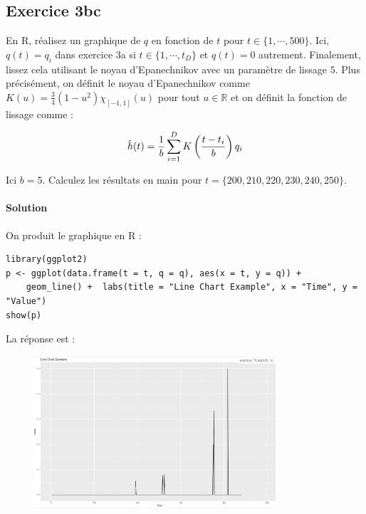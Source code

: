 \documentclass[../main.tex]{subfiles}
\begin{document}
\begin{CJK*}{UTF8}{gbsn}
\section*{Exercice 3bc}
En R, réalisez un graphique de $q$ en fonction de $t$ pour $t \in \{1, \cdots, 500\}$.
Ici, $q(t) = q_i$ dans exercice 3a si $t \in \{1, \cdots, t_D\}$ et $q(t) = 0$ autrement. 
Finalement, lissez cela utilisant le noyau d'Epanechnikov avec un paramètre de lissage $5$.
Plus précisément, on définit le noyau d'Epanechnikov comme $K(u) = \frac{3}{4}(1-u^2)\chi_{[-1,1]}(u)$
pour tout $u \in \mathbb{R}$ et on définit la fonction de lissage comme :

\begin{equation*}
    \hat{h}(t) = \frac{1}{b} \sum_{i=1}^D K\left ( \frac{t-t_i}{b} \right ) q_i
\end{equation*}

Ici $b = 5$. 
Calculez les résultats en main pour $t = \{200, 210, 220, 230, 240, 250\}$.

\smallskip
\paragraph{Solution}

On produit le graphique en R :

\begin{lstlisting}
library(ggplot2)
p <- ggplot(data.frame(t = t, q = q), aes(x = t, y = q)) +
    geom_line() +  labs(title = "Line Chart Example", x = "Time", y = "Value")
show(p)
\end{lstlisting}

La réponse est :

\begin{figure}[H]
  \centering
  \includegraphics[width=0.8\textwidth]{3BC.JPG}
  \label{fig:mesh1}
\end{figure}


\end{CJK*}
\end{document}
